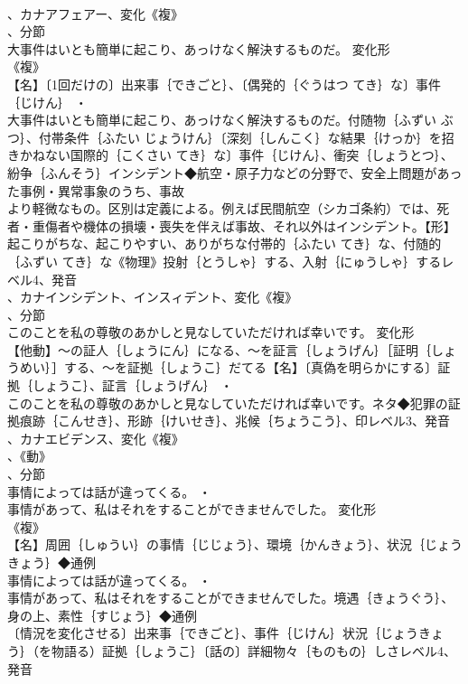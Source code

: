 \documentclass[8pt]{extreport}
\begin{document}
\begin{CJK}{UTF8}{min}
\\	、カナアフェアー、変化《複》
\\	、分節
\\	大事件はいとも簡単に起こり、あっけなく解決するものだ。	変化形 
\\	《複》
\\	【名】〔1回だけの〕出来事｛できごと｝、〔偶発的｛ぐうはつ てき｝な〕事件｛じけん｝ ・
\\	大事件はいとも簡単に起こり、あっけなく解決するものだ。付随物｛ふずい ぶつ｝、付帯条件｛ふたい じょうけん｝〔深刻｛しんこく｝な結果｛けっか｝を招きかねない国際的｛こくさい てき｝な〕事件｛じけん｝、衝突｛しょうとつ｝、紛争｛ふんそう｝インシデント◆航空・原子力などの分野で、安全上問題があった事例・異常事象のうち、事故
\\	より軽微なもの。区別は定義による。例えば民間航空（シカゴ条約）では、死者・重傷者や機体の損壊・喪失を伴えば事故、それ以外はインシデント。【形】起こりがちな、起こりやすい、ありがちな付帯的｛ふたい てき｝な、付随的｛ふずい てき｝な《物理》投射｛とうしゃ｝する、入射｛にゅうしゃ｝するレベル4、発音
\\	、カナインシデント、インスィデント、変化《複》
\\	、分節
\\	このことを私の尊敬のあかしと見なしていただければ幸いです。	変化形 
\\	【他動】～の証人｛しょうにん｝になる、～を証言｛しょうげん｝［証明｛しょうめい｝］する、～を証拠｛しょうこ｝だてる【名】〔真偽を明らかにする〕証拠｛しょうこ｝、証言｛しょうげん｝ ・
\\	このことを私の尊敬のあかしと見なしていただければ幸いです。ネタ◆犯罪の証拠痕跡｛こんせき｝、形跡｛けいせき｝、兆候｛ちょうこう｝、印レベル3、発音
\\	、カナエビデンス、変化《複》
\\	、《動》
\\	、分節
\\	事情によっては話が違ってくる。 ・
\\	事情があって、私はそれをすることができませんでした。	変化形 
\\	《複》
\\	【名】周囲｛しゅうい｝の事情｛じじょう｝、環境｛かんきょう｝、状況｛じょうきょう｝◆通例
\\	事情によっては話が違ってくる。 ・
\\	事情があって、私はそれをすることができませんでした。境遇｛きょうぐう｝、身の上、素性｛すじょう｝◆通例
\\	〔情況を変化させる〕出来事｛できごと｝、事件｛じけん｝状況｛じょうきょう｝（を物語る）証拠｛しょうこ｝〔話の〕詳細物々｛ものもの｝しさレベル4、発音

\end{CJK}
\end{document}
